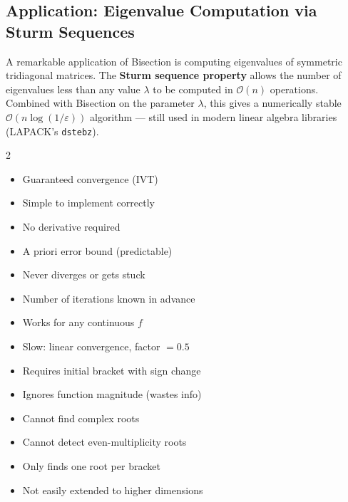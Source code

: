 \documentclass[12pt]{article}
\begin{document}
\subsection*{Application: Eigenvalue Computation via Sturm Sequences}

A remarkable application of Bisection is computing eigenvalues of symmetric tridiagonal matrices. The \textbf{Sturm sequence property} allows the number of eigenvalues less than any value $\lambda$ to be computed in $\mathcal{O}(n)$ operations. Combined with Bisection on the parameter $\lambda$, this gives a numerically stable $\mathcal{O}(n\log(1/\varepsilon))$ algorithm — still used in modern linear algebra libraries (LAPACK's \texttt{dstebz}).

\bigskip

\begin{multicols}{2}
\begin{prosbox}
\begin{itemize}[noitemsep]
  \item Guaranteed convergence (IVT)
  \item Simple to implement correctly
  \item No derivative required
  \item A priori error bound (predictable)
  \item Never diverges or gets stuck
  \item Number of iterations known in advance
  \item Works for any continuous $f$
\end{itemize}
\end{prosbox}

\columnbreak

\begin{consbox}
\begin{itemize}[noitemsep]
  \item Slow: linear convergence, factor $=0.5$
  \item Requires initial bracket with sign change
  \item Ignores function magnitude (wastes info)
  \item Cannot find complex roots
  \item Cannot detect even-multiplicity roots
  \item Only finds one root per bracket
  \item Not easily extended to higher dimensions
\end{itemize}
\end{consbox}
\end{multicols}
\end{document}
